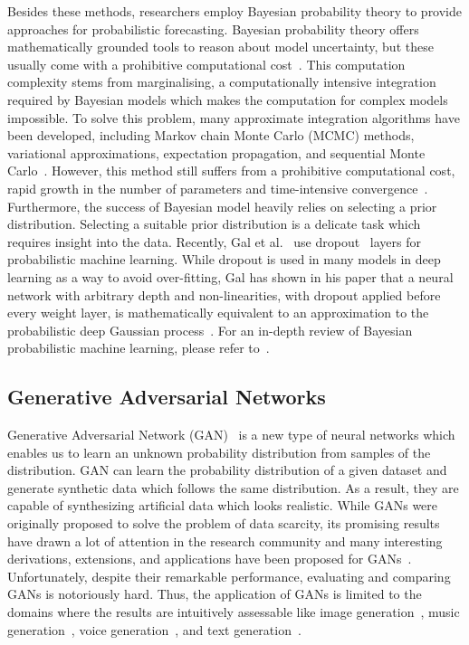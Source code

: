 \documentclass{ieeeaccess}
\begin{document}
Besides these methods, researchers employ Bayesian probability theory to provide approaches for probabilistic forecasting. Bayesian probability theory offers mathematically grounded tools to reason about model uncertainty, but these usually come with a prohibitive computational cost~\cite{gal2016dropout}. This computation complexity stems from marginalising, a computationally intensive integration required by Bayesian models which makes the computation for complex models impossible. To solve this problem, many approximate integration algorithms have been developed, including Markov chain Monte Carlo (MCMC) methods, variational approximations, expectation propagation, and sequential Monte Carlo~\cite{neal1993probabilistic,jordan1999introduction,doucet2001introduction,minka2001expectation}. However, this method still suffers from a prohibitive computational cost, rapid growth in the number of parameters and time-intensive convergence~\cite{gal2016dropout}. Furthermore, the success of Bayesian model heavily relies on selecting a prior distribution. Selecting a suitable prior distribution is a delicate task which requires insight into the data. Recently, Gal et al.~\cite{gal2016dropout} use dropout~\cite{srivastava2014dropout} layers for probabilistic machine learning. While dropout is used in many models in deep learning as a way to avoid over-fitting, Gal has shown in his paper that a neural network with arbitrary depth and non-linearities, with dropout applied before every weight layer, is mathematically equivalent to an approximation to the probabilistic deep Gaussian process~\cite{damianou2013deep}. For an in-depth review of Bayesian probabilistic machine learning, please refer to~\cite{ghahramani2015probabilistic,gal2016uncertainty}.

\subsection{Generative Adversarial Networks}
Generative Adversarial Network (GAN)~\cite{goodfellow2014generative} is a new type of neural networks which enables us to learn an unknown probability distribution from samples of the distribution. GAN can learn the probability distribution of a given dataset and generate synthetic data which follows the same distribution. As a result, they are capable of synthesizing artificial data which looks realistic. While GANs were originally proposed to solve the problem of data scarcity, its promising results have drawn a lot of attention in the research community and many interesting derivations, extensions, and applications have been proposed for GANs~\cite{DBLP:journals/corr/RadfordMC15,arjovsky2017wasserstein,DBLP:journals/corr/DonahueKD16,DBLP:journals/corr/ChenDHSSA16,mirza2014conditional}. Unfortunately, despite their remarkable performance, evaluating and comparing GANs is notoriously hard. Thus, the application of GANs is limited to the domains where the results are intuitively assessable like image generation~\cite{DBLP:journals/corr/RadfordMC15}, music generation~\cite{mogren2016c}, voice generation~\cite{gao2018voice}, and text generation~\cite{yu2017seqgan}.\bigskip
\end{document}
